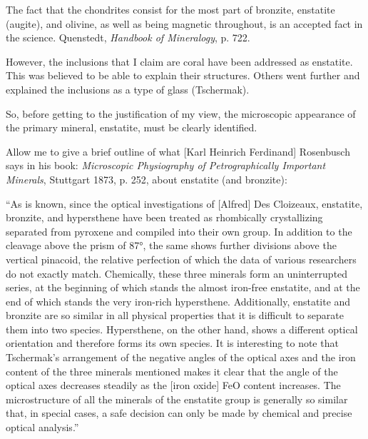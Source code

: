 \documentclass[a4paper, 12pt, oneside]{article}
\begin{document}
The fact that the chondrites consist for the most part of bronzite, enstatite (augite), and olivine, as well as being magnetic throughout, is an accepted fact in the science. Quenstedt, \emph{Handbook of Mineralogy}, p. 722.

However, the inclusions that I claim are coral have been addressed as enstatite. This was believed to be able to explain their structures. Others went further and explained the inclusions as a type of glass (Tschermak).

So, before getting to the justification of my view, the microscopic appearance of the primary mineral, enstatite, must be clearly identified.

Allow me to give a brief outline of what [Karl Heinrich Ferdinand] Rosenbusch says in his book: \emph{Microscopic Physiography of Petrographically Important Minerals}, Stuttgart 1873, p. 252, about enstatite (and bronzite):

``As is known, since the optical investigations of [Alfred] Des Cloizeaux, enstatite, bronzite, and hypersthene have been treated as rhombically crystallizing separated from pyroxene and compiled into their own group. In addition to the cleavage above the prism of 87°, the same shows further divisions above the vertical pinacoid, the relative perfection of which the data of various researchers do not exactly match. Chemically, these three minerals form an uninterrupted series, at the beginning of which stands the almost iron-free enstatite, and at the end of which stands the very iron-rich hypersthene. Additionally, enstatite and bronzite are so similar in all physical properties that it is difficult to separate them into two species. Hypersthene, on the other hand, shows a different optical orientation and therefore forms its own species. It is interesting to note that Tschermak's arrangement of the negative angles of the optical axes and the iron content of the three minerals mentioned makes it clear that the angle of the optical axes decreases steadily as the [iron oxide] FeO content increases. The microstructure of all the minerals of the enstatite group is generally so similar that, in special cases, a safe decision can only be made by chemical and precise optical analysis.''
\end{document}
